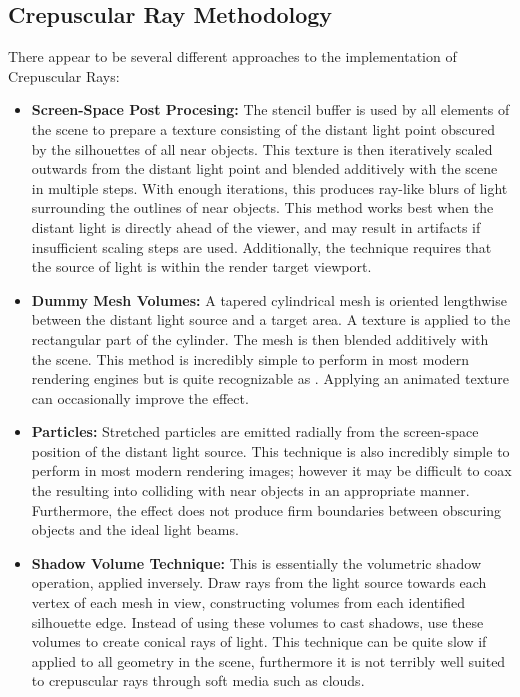 \documentclass[12pt]{article}
\begin{document}
\subsection*{Crepuscular Ray Methodology}
There appear to be several different approaches to the implementation of Crepuscular Rays:
\begin{itemize}
	\item \textbf{Screen-Space Post Procesing:} The stencil buffer is used by all  elements of the scene to prepare a texture consisting of the distant light point obscured by the silhouettes of all near objects. This texture is then iteratively scaled outwards from the distant light point and blended additively with the scene in multiple steps. With enough iterations, this produces ray-like blurs of light surrounding the outlines of near objects. This method works best when the distant light is directly ahead of the viewer, and may result in artifacts if insufficient scaling steps are used. Additionally, the technique requires that the source of light is within the render target viewport.
	\item \textbf{Dummy Mesh Volumes:} A tapered cylindrical mesh is oriented lengthwise between the distant light source and a target area. A  texture is applied to the rectangular part of the cylinder. The mesh is then blended additively with the scene. This method is incredibly simple to perform in most modern rendering engines but is quite recognizable as . Applying an animated texture can occasionally improve the effect.
	\item \textbf{Particles:} Stretched particles are emitted radially from the screen-space position of the distant light source. This technique is also incredibly simple to perform in most modern rendering images; however it may be difficult to coax the resulting  into colliding with near objects in an appropriate manner. Furthermore, the effect does not produce firm boundaries between obscuring objects and the ideal light beams.
	\item \textbf{ Shadow Volume Technique:} This is essentially the volumetric shadow operation, applied inversely. Draw rays from the light source towards each vertex of each mesh in view, constructing volumes from each identified silhouette edge. Instead of using these volumes to cast shadows, use these volumes to create conical rays of light. This technique can be quite slow if applied to all geometry in the scene, furthermore it is not terribly well suited to crepuscular rays through soft media such as clouds.

\end{itemize}
\end{document}
